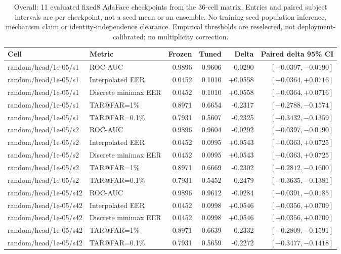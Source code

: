 \begin{table}[!t]
\caption{Overall: 11 evaluated fixed8 AdaFace checkpoints from the 36-cell matrix. Entries and paired subject intervals are per checkpoint, not a seed mean or an ensemble. No training-seed population inference, mechanism claim or identity-independence clearance. Empirical thresholds are reselected, not deployment-calibrated; no multiplicity correction.}
\label{tab:strong-fixed8-overall}
\centering\scriptsize
\begin{tabular}{@{}llrrrr@{}}
\toprule
Cell & Metric & Frozen & Tuned & Delta & Paired delta 95\% CI \\
\midrule
random/head/1e-05/s1 & ROC-AUC & 0.9896 & 0.9606 & -0.0290 & $[-0.0397,-0.0190]$ \\
random/head/1e-05/s1 & Interpolated EER & 0.0452 & 0.1010 & +0.0558 & $[+0.0364,+0.0716]$ \\
random/head/1e-05/s1 & Discrete minimax EER & 0.0452 & 0.1010 & +0.0558 & $[+0.0364,+0.0716]$ \\
random/head/1e-05/s1 & TAR@FAR=1\% & 0.8971 & 0.6654 & -0.2317 & $[-0.2788,-0.1574]$ \\
random/head/1e-05/s1 & TAR@FAR=0.1\% & 0.7931 & 0.5607 & -0.2325 & $[-0.3432,-0.1359]$ \\
random/head/1e-05/s2 & ROC-AUC & 0.9896 & 0.9604 & -0.0292 & $[-0.0397,-0.0190]$ \\
random/head/1e-05/s2 & Interpolated EER & 0.0452 & 0.0995 & +0.0543 & $[+0.0363,+0.0725]$ \\
random/head/1e-05/s2 & Discrete minimax EER & 0.0452 & 0.0995 & +0.0543 & $[+0.0363,+0.0725]$ \\
random/head/1e-05/s2 & TAR@FAR=1\% & 0.8971 & 0.6669 & -0.2302 & $[-0.2812,-0.1600]$ \\
random/head/1e-05/s2 & TAR@FAR=0.1\% & 0.7931 & 0.5452 & -0.2479 & $[-0.3635,-0.1381]$ \\
random/head/1e-05/s42 & ROC-AUC & 0.9896 & 0.9612 & -0.0284 & $[-0.0391,-0.0185]$ \\
random/head/1e-05/s42 & Interpolated EER & 0.0452 & 0.0998 & +0.0546 & $[+0.0356,+0.0709]$ \\
random/head/1e-05/s42 & Discrete minimax EER & 0.0452 & 0.0998 & +0.0546 & $[+0.0356,+0.0709]$ \\
random/head/1e-05/s42 & TAR@FAR=1\% & 0.8971 & 0.6639 & -0.2332 & $[-0.2809,-0.1591]$ \\
random/head/1e-05/s42 & TAR@FAR=0.1\% & 0.7931 & 0.5659 & -0.2272 & $[-0.3477,-0.1418]$ \\

\end{tabular}
\end{table}
